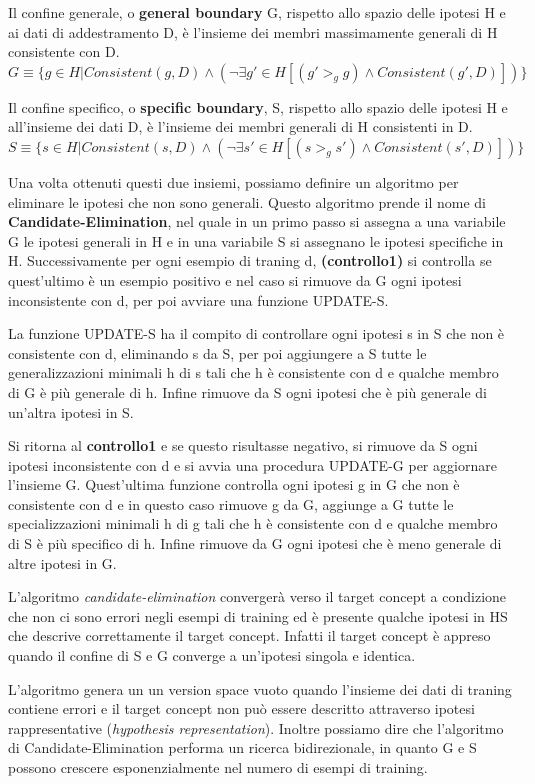 \documentclass[a4paper]{extarticle}
\begin{document}
Il confine generale, o \textbf{general boundary} G, rispetto allo spazio delle ipotesi H e ai dati di addestramento D, è l'insieme dei membri massimamente generali di H consistente con D. $G \equiv \{ g \in H | Consistent(g,D) \land ( \neg \exists g' \in H [(g' >_g g) \land Consistent(g',D)])\}$

Il confine specifico, o \textbf{specific boundary}, S, rispetto allo spazio delle ipotesi H e all'insieme dei dati D, è l'insieme dei membri generali di H consistenti in D. $S \equiv \{ s \in H | Consistent(s,D) \land ( \neg \exists s' \in H [(s >_g s') \land Consistent(s',D)])\}$

Una volta ottenuti questi due insiemi, possiamo definire un algoritmo per eliminare le ipotesi che non sono generali. Questo algoritmo prende il nome di \textbf{Candidate-Elimination}, nel quale in un primo passo si assegna a una variabile G le ipotesi generali in H e in una variabile S si assegnano le ipotesi specifiche in H. Successivamente per ogni esempio di traning d, \textbf{(controllo1)} si controlla se quest'ultimo è un esempio positivo e nel caso si rimuove da G ogni ipotesi inconsistente con d, per poi avviare una funzione UPDATE-S.

La funzione UPDATE-S ha il compito di controllare ogni ipotesi s in S che non è consistente con d, eliminando s da S, per poi aggiungere a S tutte le generalizzazioni minimali h di s tali che h è consistente con d e qualche membro di G è più generale di h. Infine rimuove da S ogni ipotesi che è più generale di un'altra ipotesi in S.

Si ritorna al \textbf{controllo1} e se questo risultasse negativo, si rimuove da S ogni ipotesi inconsistente con d e si avvia una procedura UPDATE-G per aggiornare l'insieme G. Quest'ultima funzione controlla ogni ipotesi g in G che non è consistente con d e in questo caso rimuove g da G, aggiunge a G tutte le specializzazioni minimali h di g tali che h è consistente con d e qualche membro di S è più specifico di h. Infine rimuove da G ogni ipotesi che è meno generale di altre ipotesi in G.

L'algoritmo \textit{candidate-elimination} convergerà verso il target concept a condizione che non ci sono errori negli esempi di training ed è presente qualche ipotesi in HS che descrive correttamente il target concept. Infatti il target concept è appreso quando il confine di S e G converge a un'ipotesi singola e identica.

L'algoritmo genera un un version space vuoto quando l'insieme dei dati di traning contiene errori e il target concept non può essere descritto attraverso ipotesi rappresentative (\textit{hypothesis representation}). Inoltre possiamo dire che l'algoritmo di Candidate-Elimination performa un ricerca bidirezionale, in quanto G e S possono crescere esponenzialmente nel numero di esempi di training.
\end{document}
